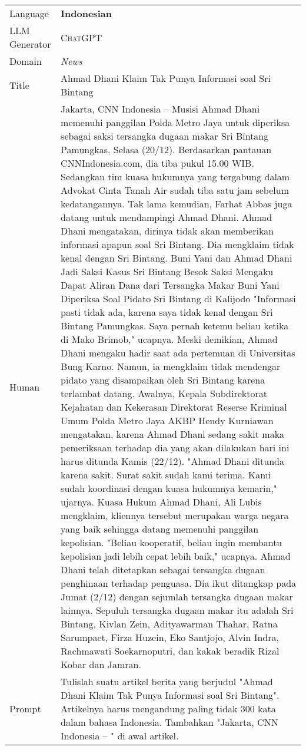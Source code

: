\begin{center}
\begin{supertabular}{l | p{12cm}}
        Language &  \textbf{Indonesian} \\
        LLM Generator & \textsc{ChatGPT} \\
        Domain &  \textit{News} \\
        \midrule
        Title & Ahmad Dhani Klaim Tak Punya Informasi soal Sri Bintang \\
        \midrule
        Human & Jakarta, CNN Indonesia -- Musisi Ahmad Dhani memenuhi panggilan Polda Metro Jaya untuk diperiksa sebagai saksi tersangka dugaan makar Sri Bintang Pamungkas, Selasa (20/12). Berdasarkan pantauan CNNIndonesia.com, dia tiba pukul 15.00 WIB. Sedangkan tim kuasa hukumnya yang tergabung dalam Advokat Cinta Tanah Air sudah tiba satu jam sebelum kedatangannya. Tak lama kemudian, Farhat Abbas juga datang untuk mendampingi Ahmad Dhani. Ahmad Dhani mengatakan, dirinya tidak akan memberikan informasi apapun soal Sri Bintang. Dia mengklaim tidak kenal dengan Sri Bintang. Buni Yani dan Ahmad Dhani Jadi Saksi Kasus Sri Bintang Besok Saksi Mengaku Dapat Aliran Dana dari Tersangka Makar Buni Yani Diperiksa Soal Pidato Sri Bintang di Kalijodo "Informasi pasti tidak ada, karena saya tidak kenal dengan Sri Bintang Pamungkas. Saya pernah ketemu beliau ketika di Mako Brimob," ucapnya. Meski demikian, Ahmad Dhani mengaku hadir saat ada pertemuan di Universitas Bung Karno. Namun, ia mengklaim tidak mendengar pidato yang disampaikan oleh Sri Bintang karena terlambat datang. Awalnya, Kepala Subdirektorat Kejahatan dan Kekerasan Direktorat Reserse Kriminal Umum Polda Metro Jaya AKBP Hendy Kurniawan mengatakan, karena Ahmad Dhani sedang sakit maka pemeriksaan terhadap dia yang akan dilakukan hari ini harus ditunda Kamis (22/12). "Ahmad Dhani ditunda karena sakit. Surat sakit sudah kami terima. Kami sudah koordinasi dengan kuasa hukumnya kemarin," ujarnya. Kuasa Hukum Ahmad Dhani, Ali Lubis mengklaim, kliennya tersebut merupakan warga negara yang baik sehingga datang memenuhi panggilan kepolisian. "Beliau kooperatif, beliau ingin membantu kepolisian jadi lebih cepat lebih baik," ucapnya. Ahmad Dhani telah ditetapkan sebagai tersangka dugaan penghinaan terhadap penguasa. Dia ikut ditangkap pada Jumat (2/12) dengan sejumlah tersangka dugaan makar lainnya. Sepuluh tersangka dugaan makar itu adalah Sri Bintang, Kivlan Zein, Adityawarman Thahar, Ratna Sarumpaet, Firza Huzein, Eko Santjojo, Alvin Indra, Rachmawati Soekarnoputri, dan kakak beradik Rizal Kobar dan Jamran.\\ 
        \midrule
        Prompt & Tulislah suatu artikel berita yang berjudul "Ahmad Dhani Klaim Tak Punya Informasi soal Sri Bintang". Artikelnya harus mengandung paling tidak 300 kata dalam bahasa Indonesia.     Tambahkan "Jakarta, CNN Indonesia -- " di awal artikel. \\

\end{supertabular}
\end{center}
